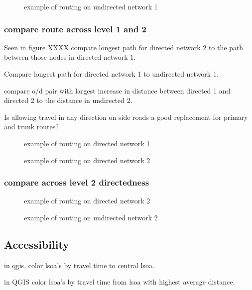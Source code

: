 \begin{figure}
\centering
\caption{example of routing on undirected network 1}
\label{fig:routing_1}
\end{figure}

\subsubsection{compare route across level 1 and 2}

Seen in figure XXXX  compare longest path for directed network 2 to the path between those nodes in directed network 1. 

Compare longest path for directed network 1 to undirected network 1. 

compare o/d pair with largest increase in distance between directed 1 and directed 2 to the distance in undirected 2. 

Is allowing travel in any direction on side roads a good replacement for primary and trunk routes?


\begin{figure}
\centering
\caption{example of routing on directed network 1}
\label{fig:routing_1}
\end{figure}

\begin{figure}
\centering
\caption{example of routing on directed network 2}
\label{fig:routing_1}
\end{figure}

\subsubsection{compare across level 2 directedness}

\begin{figure}
\centering
\caption{example of routing on directed network 2}
\label{fig:routing_1}
\end{figure}

\begin{figure}
\centering
\caption{example of routing on undirected network 2}
\label{fig:routing_1}
\end{figure}


\subsection{Accessibility}

in qgis, color lsoa's by travel time to central lsoa. 

in QGIS color lsoa's by travel time from lsoa with highest average distance. 

